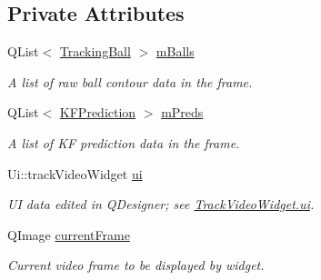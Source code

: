 \subsection*{Private Attributes}
\begin{DoxyCompactItemize}
\item 
Q\+List$<$ \hyperlink{classTrackingBall}{Tracking\+Ball} $>$ \hyperlink{classTrackVideoWidget_add8a33b2399ca9b4c455941776ad9f09}{m\+Balls}\hypertarget{classTrackVideoWidget_add8a33b2399ca9b4c455941776ad9f09}{}\label{classTrackVideoWidget_add8a33b2399ca9b4c455941776ad9f09}

\begin{DoxyCompactList}\small\item\em A list of raw ball contour data in the frame. \end{DoxyCompactList}\item 
Q\+List$<$ \hyperlink{classKFPrediction}{K\+F\+Prediction} $>$ \hyperlink{classTrackVideoWidget_a9ec725863b7ffbffb143708157fe01ba}{m\+Preds}\hypertarget{classTrackVideoWidget_a9ec725863b7ffbffb143708157fe01ba}{}\label{classTrackVideoWidget_a9ec725863b7ffbffb143708157fe01ba}

\begin{DoxyCompactList}\small\item\em A list of KF prediction data in the frame. \end{DoxyCompactList}\item 
Ui\+::track\+Video\+Widget \hyperlink{classTrackVideoWidget_a0ad86a928b90b7a632bcd92796bb4053}{ui}\hypertarget{classTrackVideoWidget_a0ad86a928b90b7a632bcd92796bb4053}{}\label{classTrackVideoWidget_a0ad86a928b90b7a632bcd92796bb4053}

\begin{DoxyCompactList}\small\item\em UI data edited in Q\+Designer; see \hyperlink{classTrackVideoWidget_a0ad86a928b90b7a632bcd92796bb4053}{Track\+Video\+Widget.\+ui}. \end{DoxyCompactList}\item 
Q\+Image \hyperlink{classTrackVideoWidget_a9eff079e25047c24da7d3e20d4d99988}{current\+Frame}\hypertarget{classTrackVideoWidget_a9eff079e25047c24da7d3e20d4d99988}{}\label{classTrackVideoWidget_a9eff079e25047c24da7d3e20d4d99988}

\begin{DoxyCompactList}\small\item\em Current video frame to be displayed by widget. \end{DoxyCompactList}\end{DoxyCompactItemize}


